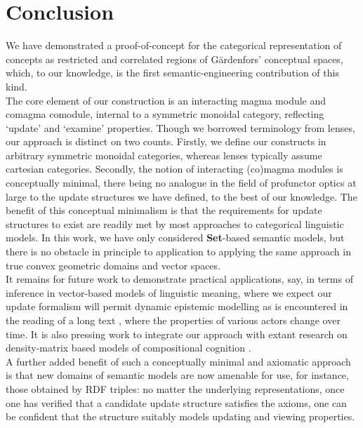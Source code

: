 \documentclass[11pt]{article}
\theoremstyle{definition}
\theoremstyle{plain}
\begin{document}
\section{Conclusion}

We have demonstrated a proof-of-concept for the categorical representation of concepts as restricted and correlated regions of G\"{a}rdenfors' conceptual spaces, which, to our knowledge, is the first semantic-engineering contribution of this kind.\\

The core element of our construction is an interacting magma module and comagma comodule, internal to a symmetric monoidal category, reflecting `update' and `examine' properties. Though we borrowed terminology from lenses, our approach is distinct on two counts. Firstly, we define our constructs in arbitrary symmetric monoidal categories, whereas lenses typically assume cartesian categories. Secondly, the notion of interacting (co)magma modules is conceptually minimal, there being no analogue in the field of profunctor optics at large to the update structures we have defined, to the best of our knowledge. The benefit of this conceptual minimalism is that the requirements for update structures to exist are readily met by most approaches to categorical linguistic models. In this work, we have only considered \textbf{Set}-based semantic models, but there is no obstacle in principle to application to applying the same approach in true convex geometric domains and vector spaces.\\

It remains for future work to demonstrate practical applications, say, in terms of inference in vector-based models of linguistic meaning, where we expect our update formalism will permit dynamic epistemic modelling as is encountered in the reading of a long text \cite{coecke_mathematics_2019}, where the properties of various actors change over time. It is also pressing work to integrate our approach with extant research on density-matrix based models of compositional cognition \cite{al-mehairi_compositional_2016}.\\

A further added benefit of such a conceptually minimal and axiomatic approach is that new domains of semantic models are now amenable for use, for instance, those obtained by RDF triples: no matter the underlying representations, once one has verified that a candidate update structure satisfies the axioms, one can be confident that the structure suitably models updating and viewing properties.\\
\end{document}
